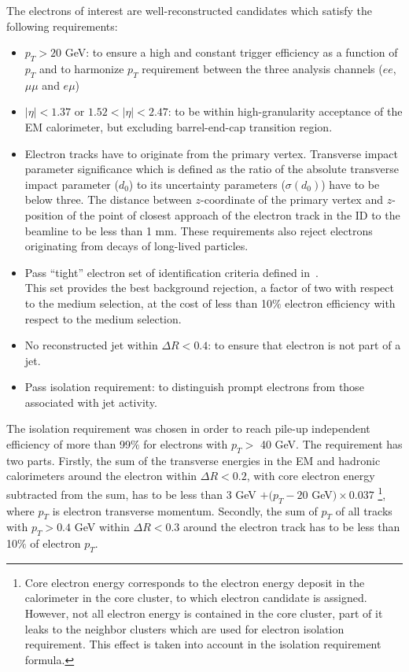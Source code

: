 The electrons of interest are well-reconstructed candidates which satisfy
the following requirements:
\begin{itemize}
 \item $p_T > 20$ GeV: to ensure a high and constant trigger efficiency as a function of $p_T$ and to harmonize $p_T$ requirement between the three analysis channels ($ee$, $\mu\mu$ and $e\mu$) 
 \item $|\eta|<1.37$ or $1.52<|\eta|<2.47$: to be within high-granularity acceptance of the EM calorimeter, but excluding barrel-end-cap transition region.
 \item Electron tracks have to originate from the primary vertex.
 Transverse impact parameter significance which is defined as the ratio of the absolute transverse impact parameter ($d_0$) to its uncertainty parameters ($\sigma(d_0)$) have to be below three. The distance between $z$-coordinate of the primary vertex and $z$-position of the point of closest approach of the electron track in the ID to the beamline to be less than 1 mm.
 These requirements also reject electrons originating from decays of long-lived particles.
 \item Pass ``tight'' electron set of identification criteria defined in~\cite{electron_tight}. \\ 
 This set provides the best background rejection, a factor of two with respect to the medium selection, 
 at the cost of less than 10$\%$ electron efficiency with respect to the medium selection.
 \item No reconstructed jet within $\Delta R < 0.4$: 
 to ensure that electron is not part of a jet.
 \item Pass isolation requirement: to distinguish prompt electrons from those associated with jet activity.
\end{itemize}

The isolation requirement was chosen in order to reach pile-up independent efficiency of more than 99$\%$ for electrons 
with $p_T >$ 40 GeV. The requirement has two parts.
Firstly, the sum of the transverse energies in the EM and hadronic calorimeters around the electron within 
$\Delta R < 0.2$, with core electron energy subtracted from the sum, has to be less than 
3 GeV $+ (p_T - 20$ GeV$) \times 0.037$
\footnote{
Core electron energy corresponds to the electron energy deposit in the calorimeter in the core cluster, to which electron candidate is assigned. However, not all electron energy is contained in the core cluster, part of it leaks to the neighbor clusters which are used for electron isolation requirement. This effect is taken into account in the isolation requirement formula.}, 
where $p_T$ is electron transverse momentum.
Secondly, the sum of $p_T$ of all tracks with $p_T > 0.4$ GeV within $\Delta R < 0.3$ around the electron track has
to be less than 10$\%$ of electron $p_T$.

